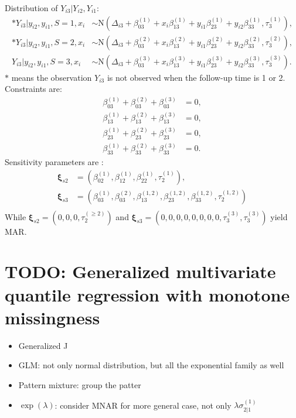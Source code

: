 \documentclass[12pt]{article}
\begin{document}
Distribution of $Y_{i3} | Y_{i2}, Y_{i1}$:
\begin{align}
  \label{eq:tri3}
  * Y_{i3} | y_{i2}, y_{i1} , S = 1, x_i & \sim \textrm{N}(\Delta_{i3} + \beta_{03}^{(1)} + x_i\beta_{13}^{(1)} + y_{i1}\beta_{23}^{(1)} + y_{i2}\beta_{33}^{(1)}, \tau_3^{(1)}),  \\
  * Y_{i3} | y_{i2}, y_{i1} , S = 2, x_i & \sim \textrm{N}(\Delta_{i3} + \beta_{03}^{(2)} + x_i\beta_{13}^{(2)} + y_{i1}\beta_{23}^{(2)} + y_{i2}\beta_{33}^{(2)}, \tau_3^{(2)}),  \\
  Y_{i3} | y_{i2}, y_{i1} , S = 3, x_i & \sim \textrm{N}(\Delta_{i3} + \beta_{03}^{(3)} +
  x_i\beta_{13}^{(3)} + y_{i1}\beta_{23}^{(3)} + y_{i2}\beta_{33}^{(3)}, \tau_3^{(3)}).
\end{align}
$*$ means the observation $Y_{i3}$ is not observed when the follow-up
time is 1 or 2. Constraints are:
\begin{align}
  \label{eq:constbi3}
  \beta_{03}^{(1)} + \beta_{03}^{(2)}  + \beta_{03}^{(3)}& = 0 , \\
  \beta_{13}^{(1)} + \beta_{13}^{(2)}  + \beta_{13}^{(3)}& = 0 , \\
  \beta_{23}^{(1)} + \beta_{23}^{(2)}  + \beta_{23}^{(3)}& = 0 , \\
  \beta_{33}^{(1)} + \beta_{33}^{(2)} + \beta_{33}^{(3)}& = 0 .
\end{align}
Sensitivity parameters are :
\begin{align*}
  \bm \xi_{s2} &= (\beta_{02}^{(1)}, \beta_{12}^{(1)}, \beta_{22}^{(1)}, \tau_2^{(1)}), \\
  \bm \xi_{s3} &= (\beta_{03}^{(1)},\beta_{03}^{(2)},  \beta_{13}^{(1,2)}, \beta_{23}^{(1, 2)}, \beta_{33}^{(1,2)}, \tau_2^{(1, 2)}) \\
\end{align*}
While $\bm \xi_{s2} = (0, 0, 0, \tau_2^{(\geq 2)})$ and $\bm \xi_{s3} = (0, 0, 0,
0, 0, 0, 0, 0, \tau_3^{(3)}, \tau_3^{(3)})$ yield MAR.
\section{TODO: Generalized multivariate quantile regression with monotone missingness }
\label{sec:general}

\begin{itemize}
\item Generalized J 
\item GLM: not only normal distribution, but all the exponential family as well
\item Pattern mixture: group the patter
\item $\exp(\lambda)$: consider MNAR for more general case, not only $\lambda\sigma_{2|1}^{(1)}$
\end{itemize}
\end{document}
